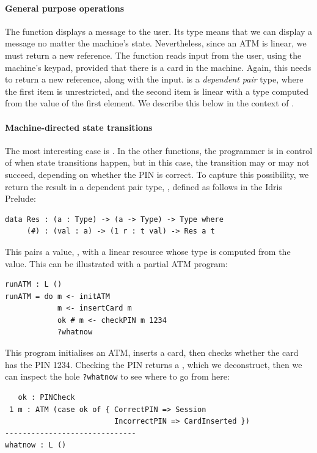 \paragraph*{General purpose operations}

The  function displays a message to the user. Its type means that
we can display a message no matter the machine's state. Nevertheless, since an
ATM is linear, we must return a new reference. The  function
reads input from the user, using the machine's keypad, provided that there
is a card in the machine. Again, this needs to return a new reference, along
with the input.
%
 is a \emph{dependent pair} type, where the first item is
unrestricted, and the second item is linear with a type computed from the
value of the first element. We describe this below in the context of
.

\paragraph*{Machine-directed state transitions}

The most interesting case is . In the other functions, the
programmer is in control of when state transitions happen, but in this case,
the transition may or may not succeed, depending on whether the PIN is
correct. To capture this possibility, we return the result in a dependent
pair type, , defined as follows in the Idris Prelude:

\begin{lstlisting}
data Res : (a : Type) -> (a -> Type) -> Type where
     (#) : (val : a) -> (1 r : t val) -> Res a t
\end{lstlisting}

This pairs a value, , with a linear resource whose type is computed
from the value. This can be illustrated with a partial ATM program:

\begin{lstlisting}
runATM : L ()
runATM = do m <- initATM
            m <- insertCard m
            ok # m <- checkPIN m 1234
            ?whatnow
\end{lstlisting}

This program initialises an ATM, inserts a card, then checks whether the card
has the PIN 1234. Checking the PIN returns a , which we deconstruct,
then we can inspect the hole \texttt{?whatnow} to see where to go from here:

\begin{lstlisting}
   ok : PINCheck
 1 m : ATM (case ok of { CorrectPIN => Session
                         IncorrectPIN => CardInserted })
------------------------------
whatnow : L ()
\end{lstlisting}

